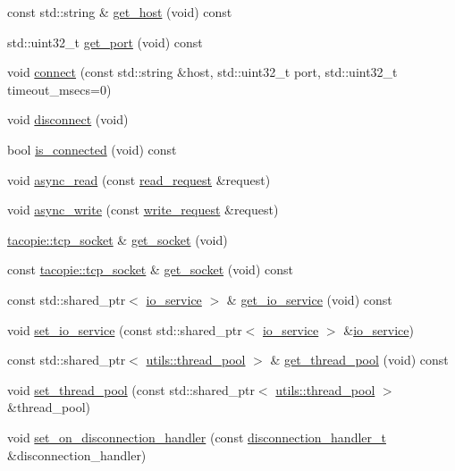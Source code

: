 \begin{DoxyCompactItemize}
const std\+::string \& \hyperlink{classtacopie_1_1tcp__client_ad38ab710c5eca64de2f887abc455b15d}{get\+\_\+host} (void) const
\item 
std\+::uint32\+\_\+t \hyperlink{classtacopie_1_1tcp__client_a3b42ae2afe6d5ee5f2f16b8bd7846f37}{get\+\_\+port} (void) const
\item 
void \hyperlink{classtacopie_1_1tcp__client_a0cfbb18cb72aa3b6a41921f61cacc425}{connect} (const std\+::string \&host, std\+::uint32\+\_\+t port, std\+::uint32\+\_\+t timeout\+\_\+msecs=0)
\item 
void \hyperlink{classtacopie_1_1tcp__client_ae0c84f8ef38a327c73cd8314cba59de7}{disconnect} (void)
\item 
bool \hyperlink{classtacopie_1_1tcp__client_a9bf568812c8350260843842e7952c8c3}{is\+\_\+connected} (void) const
\item 
void \hyperlink{classtacopie_1_1tcp__client_a120e3ec2902acc902f7a0b27074bda6b}{async\+\_\+read} (const \hyperlink{structtacopie_1_1tcp__client_1_1read__request}{read\+\_\+request} \&request)
\item 
void \hyperlink{classtacopie_1_1tcp__client_a2304ed6d4ca0cbc74e6aa72d3e92b76a}{async\+\_\+write} (const \hyperlink{structtacopie_1_1tcp__client_1_1write__request}{write\+\_\+request} \&request)
\item 
\hyperlink{classtacopie_1_1tcp__socket}{tacopie\+::tcp\+\_\+socket} \& \hyperlink{classtacopie_1_1tcp__client_a1a3834deb1d263ec5816066f74286298}{get\+\_\+socket} (void)
\item 
const \hyperlink{classtacopie_1_1tcp__socket}{tacopie\+::tcp\+\_\+socket} \& \hyperlink{classtacopie_1_1tcp__client_a9cf1f3ccf43f9a0a883a17b15e3668d6}{get\+\_\+socket} (void) const
\item 
const std\+::shared\+\_\+ptr$<$ \hyperlink{classtacopie_1_1io__service}{io\+\_\+service} $>$ \& \hyperlink{classtacopie_1_1tcp__client_ae1a9fc6cbbd500b382a5e43c48471964}{get\+\_\+io\+\_\+service} (void) const
\item 
void \hyperlink{classtacopie_1_1tcp__client_a335bbe54644618210ab45f3425726e6f}{set\+\_\+io\+\_\+service} (const std\+::shared\+\_\+ptr$<$ \hyperlink{classtacopie_1_1io__service}{io\+\_\+service} $>$ \&\hyperlink{classtacopie_1_1io__service}{io\+\_\+service})
\item 
const std\+::shared\+\_\+ptr$<$ \hyperlink{classtacopie_1_1utils_1_1thread__pool}{utils\+::thread\+\_\+pool} $>$ \& \hyperlink{classtacopie_1_1tcp__client_a79f2191e28e97b71da3a9e402134673f}{get\+\_\+thread\+\_\+pool} (void) const
\item 
void \hyperlink{classtacopie_1_1tcp__client_aa484994fc605cd93c18a496c376f4589}{set\+\_\+thread\+\_\+pool} (const std\+::shared\+\_\+ptr$<$ \hyperlink{classtacopie_1_1utils_1_1thread__pool}{utils\+::thread\+\_\+pool} $>$ \&thread\+\_\+pool)
\item 
void \hyperlink{classtacopie_1_1tcp__client_a8c290d681186edb0578051c04f3c0762}{set\+\_\+on\+\_\+disconnection\+\_\+handler} (const \hyperlink{classtacopie_1_1tcp__client_aca5df52e5ee6fa673cf212532ada1453}{disconnection\+\_\+handler\+\_\+t} \&disconnection\+\_\+handler)
\end{DoxyCompactItemize}



